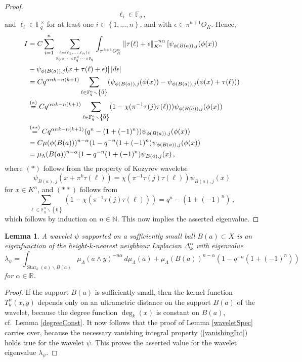 \documentclass[a4paper,draft]{ZbRad}
\theoremstyle{plain}
\newtheorem{lem}{Lemma}[section]
\theoremstyle{definition}
\numberwithin{equation}{section}
\renewcommand{\setminus}{\smallsetminus}
\newcommand{\mathset}[1]{{\left\{#1\right\}}}
\newcommand{\absolute}[1]{\left\lvert#1\right\rvert}
\newcommand{\norm}[1]{\left\|#1\right\|}
\DeclareMathOperator{\Star}{Star}
\begin{document}
\begin{proof}
\[\ell_i\in\mathbb{F}_q\,,
\]
and $\ell_i\in \mathbb{F}_q^\times$ for  at least one $i\in\mathset{1,\dots, n}$, and with $\epsilon\in\pi^{k+1}O_K$. Hence, 
\begin{align*}
I &= C
\sum\limits_{i=1}^n
\sum\limits_{\ell=(\ell_1,\dots,\ell_n)\in\atop\mathbb{F}_q\times\dots\times\mathbb{F}_q^\times\dots\times\mathbb{F}_q}
\int_{\pi^{k+1}O_K^n}
\norm{\tau(\ell)+\epsilon}_{K^n}^{-n\alpha}[\psi_{\phi(B(a)),j}(\phi(x))
\\
&-\psi_{\phi(B(a)),j}(x+\tau(\ell)+\epsilon)]\absolute{d\epsilon}
\\
&=
 Cq^{\alpha nk-n(k+1)}
\sum\limits_{\ell\in\mathbb{F}_q^n\setminus\mathset{\bar{0}}}
(\psi_{\phi(B(a)),j} (\phi(x))
- \psi_{\phi(B(a)),j} (\phi(x) + \tau(\ell)))
\\
&\stackrel{(*)}{=}
C q^{\alpha nk-n(k+1)}
\sum\limits_{\ell\in\mathbb{F}_q^n\setminus\mathset{\bar{0}}}
(1 - \chi(\pi^{-1}\tau(j)\tau(\ell))) \psi_{\phi(B(a)),j} (\phi(x))
\\
&\stackrel{(**)}{=}
C q^{\alpha nk-n(k+1)}
(q^n - (1 + (-1)^n))\psi_{\phi(B(a)),j} (\phi(x))
\\
&= 
C\mu(\phi(B(a)))^{n-\alpha}
(1- q^{-n} (1 + (-1)^n)
\psi_{\phi(B(a)),j}(\phi(x))
\\
&= \mu_\Lambda(B(a))^{n-\alpha}
( 1 - q^{-n} (1 + (-1)^n )\psi_{B(a),j} (x)\,,
\end{align*}
where $(*)$ follows from the property of Kozyrev wavelets:
\[
\psi_{B(a),j} (x + \pi^k\tau(\ell)) = \chi(\pi^{-1} \tau(j)\tau(\ell))\psi_{B(a),j} (x)
\]
for $x\in K^n$, and
$(**)$ follows from
\[
\sum\limits_{\ell\in\mathbb{F}_q^n\setminus\mathset{\bar{0}}}
(1 - \chi(\pi^{-1}\tau(j)\tau (\ell))) 
= q^n - (1 + (-1)^n)\,,
\]
which follows by induction on $n\in\mathbb{N}$. 
This now implies the asserted eigenvalue.
\end{proof}

\begin{lem}\label{waveletSpec_kNNh}
A wavelet $\psi$ supported on a sufficiently small ball $B(a)\subset X$ is an eigenfunction of the height-$k$-nearest neighbour Laplacian $\Delta_k^\alpha$ with eigenvalue 
\[
\lambda_\psi=\int_{\Star_k(a)\setminus B(a)}
\mu_\Lambda(a\wedge y)^{-n\alpha}\,d\mu_\Lambda(a)
+\mu_\Lambda(B(a))^{n-\alpha}(1-q^{-n}(1+(-1)^n))
\]
for $\alpha\in\mathbb{R}$.
\end{lem}

\begin{proof}
If the support $B(a)$ is sufficiently small, then the kernel function $T_k^\alpha(x,y)$ depends only on an ultrametric distance
on the support $B(a)$ of the wavelet, because the degree function $\deg_k(x)$ is
constant on $B(a)$, cf.\ Lemma \ref{degreeConst}. It now follows that the proof of 
Lemma \ref{waveletSpec} carries over, because the necessary vanishing integral property (\ref{vanishingInt})
holds true for the wavelet $\psi$. This proves the asserted value for the wavelet eigenvalue $\lambda_\psi$.
\end{proof}
\end{document}
